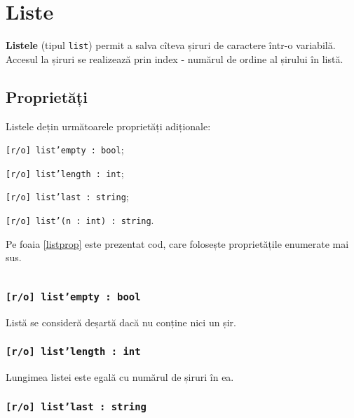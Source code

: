 \section{Liste}

{\bf Listele} (tipul \texttt{list}) permit a salva cîteva șiruri de caractere într-o variabilă. Accesul la șiruri se realizează prin index - numărul de ordine al șirului în listă.

\subsection{Proprietăți}

Listele dețin următoarele proprietăți adiționale:
\begin{icItems}
\item
	\texttt{[r/o] list'empty : bool};
\item
	\texttt{[r/o] list'length : int};
\item
	\texttt{[r/o] list'last : string};
\item
	\texttt{[r/o] list'(n : int) : string}.
\end{icItems}

Pe foaia \ref{listprop} este prezentat cod, care folosește proprietățile enumerate mai sus.

\begin{sourcecode}
\label{listprop}
\inputminted[linenos]{icl}{../sources/listprop.icL}
\end{sourcecode}

\subsubsection{\texttt{[r/o] list'empty : bool}}

Listă se consideră deșartă dacă nu conține nici un șir.

\subsubsection{\texttt{[r/o] list'length : int}}

Lungimea listei este egală cu numărul de șiruri în ea.

\subsubsection{\texttt{[r/o] list'last : string}}

